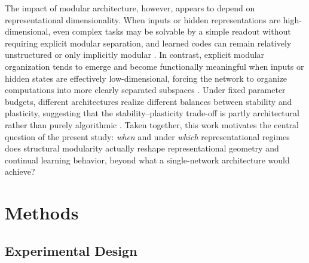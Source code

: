 \documentclass{article}
\theoremstyle{plain}
\theoremstyle{definition}
\theoremstyle{remark}
\begin{document}
The impact of modular architecture, however, appears to depend on representational dimensionality. When inputs or hidden representations are high-dimensional, even complex tasks may be solvable by a simple readout without requiring explicit modular separation, and learned codes can remain relatively unstructured or only implicitly modular \cite{Johnston2024.09.30.615925}. In contrast, explicit modular organization tends to emerge and become functionally meaningful when inputs or hidden states are effectively low-dimensional, forcing the network to organize computations into more clearly separated subspaces \cite{Johnston2024.09.30.615925,yu2025dimensionality,lu2025rethinking}. Under fixed parameter budgets, different architectures realize different balances between stability and plasticity, suggesting that the stability–plasticity trade-off is partly architectural rather than purely algorithmic \cite{lu2025rethinking}. Taken together, this work motivates the central question of the present study: \emph{when} and under \emph{which} representational regimes does structural modularity actually reshape representational geometry and continual learning behavior, beyond what a single-network architecture would achieve?

\section{Methods}
        \subsection{Experimental Design}
        
\end{document}
